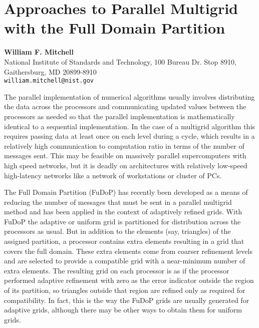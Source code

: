 \documentclass[11pt]{article}
\newcommand{\nextab}[4]{
	\section{#2}
	{\bf #1} \\ \nopagebreak
	{#3} \\ \nopagebreak
	{\tt #4} \nopagebreak
	}
\begin{document}

\nextab{William F. Mitchell}
	{Approaches to Parallel Multigrid with the Full Domain Partition}
	{National Institute of Standards and Technology,
	100 Bureau Dr. Stop 8910, Gaithersburg, MD 20899-8910}
	{william.mitchell@nist.gov}

The parallel implementation of numerical algorithms usually involves
distributing the data across the processors and communicating updated
values between the processors as needed so that the parallel implementation
is mathematically identical to a sequential implementation.  In the case
of a multigrid algorithm this requires passing data at least once on each
level during a cycle, which results in a relatively high communication to
computation ratio in terms of the number of messages sent.  This may be
feasible on massively parallel supercomputers with high speed networks, but
it is deadly on architectures with relatively low-speed high-latency
networks like a network of workstations or cluster of PCs.

The Full Domain Partition (FuDoP) has recently been developed as a means of
reducing the number of messages that must be sent in a parallel multigrid
method and has been applied in the context of adaptively refined grids.
With FuDoP the adaptive or uniform grid is partitioned for distribution
across the processors as usual.  But in addition to the elements (say,
triangles) of the assigned partition, a processor contains extra elements
resulting in a grid that covers the full domain.  These extra elements come
from coarser refinement levels and are selected to provide a compatible
grid with a near-minimum number of extra elements.  The resulting grid on
each processor is as if the processor performed adaptive refinement with
zero as the error indicator outside the region of its partition, so
triangles outside that region are refined only as required for compatibility.
In fact, this is the way the FuDoP grids are usually generated for adaptive
grids, although there may be other ways to obtain them for uniform grids.
\end{document}
